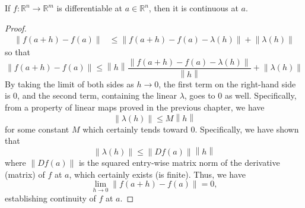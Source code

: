 \begin{prop}
If $f:\mathbb{R}^n \rightarrow \mathbb{R}^m$ is differentiable at $a\in \mathbb{R}^n$, then it is continuous at $a$.
\end{prop}
\begin{proof}
\begin{align*}
	\left\lVert f\left(a+h\right) - f\left(a\right) \right\rVert & \leq \left\lVert f\left(a+h\right) - f\left(a\right) - \lambda\left(h\right) \right\rVert + \left\lVert \lambda\left(h\right) \right\rVert
\end{align*}
so that \[ \left\lVert f\left(a+h\right) - f\left(a\right) \right\rVert \leq \left\lVert h \right\rVert \frac{\left\lVert f\left(a+h\right) - f\left(a\right) - \lambda\left(h\right) \right\rVert}{\left\lVert h \right\rVert} + \left\lVert \lambda\left(h\right) \right\rVert \]
By taking the limit of both sides as $h\rightarrow 0$, the first term on the right-hand side is $0$, and the second term, containing the linear $\lambda$, goes to $0$ as well. Specifically, from a property of linear maps proved in the previous chapter, we have \[ \left\lVert \lambda\left(h\right) \right\rVert \leq M \left\lVert h \right\rVert \] for some constant $M$ which certainly tends toward $0$. Specifically, we have shown that \[ \left\lVert \lambda\left(h\right) \right\rVert \leq \left\lVert Df\left(a\right)\right\rVert \left\lVert h \right\rVert \] where $\left\lVert Df\left(a\right)\right\rVert$ is the squared entry-wise matrix norm of the derivative (matrix) of $f$ at $a$, which certainly exists (is finite). Thus, we have \[ \lim_{h\rightarrow 0} \left\lVert f\left(a+h\right) - f\left(a\right) \right\rVert = 0, \] establishing continuity of $f$ at $a$.
\end{proof}







